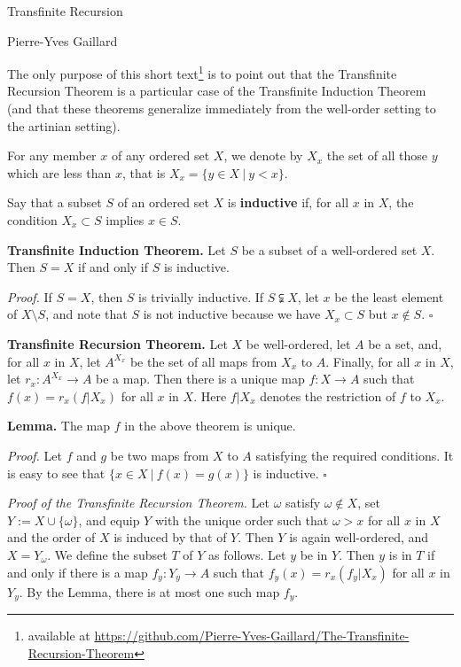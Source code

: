 \documentclass[12pt,letterpaper]{article}
\newcommand{\nn}{\noindent}
\begin{document}
\begin{center}
{\Huge Transfinite Recursion}\bigskip 

{\normalsize Pierre-Yves Gaillard}
\end{center}

\nn The only purpose of this short text\footnote{available at \url{https://github.com/Pierre-Yves-Gaillard/The-Transfinite-Recursion-Theorem}} is to point out that the Transfinite Recursion Theorem is a particular case of the Transfinite Induction Theorem (and that these theorems generalize immediately from the well-order setting to the artinian setting). 

For any member $x$ of any ordered set $X$, we denote by $X_x$ the set of all those $y$ which are less than $x$, that is $X_x=\{y\in X\ |\ y<x\}$. 

Say that a subset $S$ of an ordered set $X$ is \textbf{inductive} if, for all $x$ in $X$, the condition $X_x\subset S$ implies $x\in S$. 

\nn\textbf{Transfinite Induction Theorem.} Let $S$ be a subset of a well-ordered set $X$. Then $S=X$ if and only if $S$ is inductive. 

\nn\emph{Proof.} If $S=X$, then $S$ is trivially inductive. If $S\subsetneqq X$, let $x$ be the least element of $X\setminus S$, and note that $S$ is not inductive because we have $X_x\subset S$ but $x\notin S$. $\square$

\nn\textbf{Transfinite Recursion Theorem.} Let $X$ be well-ordered, let $A$ be a set, and, for all $x$ in $X$, let $A^{X_x}$ be the set of all maps from $X_x$ to $A$. Finally, for all $x$ in $X$, let $r_x:A^{X_x}\to A$ be a map. Then there is a unique map $f:X\to A$ such that $f(x)=r_x(f|X_x)$ for all $x$ in $X$. Here $f|X_x$ denotes the restriction of $f$ to $X_x$. 

\nn\textbf{Lemma.} The map $f$ in the above theorem is unique. 

\nn\emph{Proof.} Let $f$ and $g$ be two maps from $X$ to $A$ satisfying the required conditions. It is easy to see that $\{x\in X\ |\ f(x)=g(x)\}$ is inductive. $\square$ 

\nn\emph{Proof of the Transfinite Recursion Theorem.} Let $\omega$ satisfy $\omega\notin X$, set $Y:=X\cup\{\omega\}$, and equip $Y$ with the unique order such that $\omega>x$ for all $x$ in $X$ and the order of $X$ is induced by that of $Y$. Then $Y$ is again well-ordered, and $X=Y_\omega$. We define the subset $T$ of $Y$ as follows. Let $y$ be in $Y$. Then $y$ is in $T$ if and only if there is a map $f_y:Y_y\to A$ such that $f_y(x)=r_x(f_y|X_x)$ for all $x$ in $Y_y$. By the Lemma, there is at most one such map $f_y$. 
\end{document}
